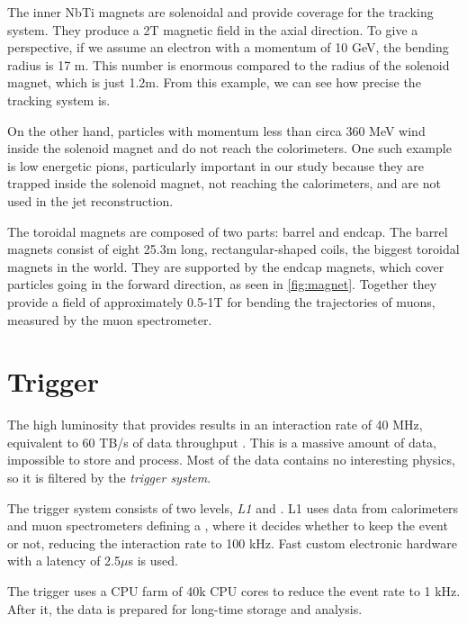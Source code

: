 The inner NbTi magnets are solenoidal and provide coverage for the tracking system.
They produce a 2T magnetic field in the axial direction.
To give a perspective, if we assume an electron with a momentum of 10 GeV, the bending radius is 17 m.
This number is enormous compared to the radius of the solenoid magnet, which is just 1.2m. 
From this example, we can see how precise the tracking system is.

On the other hand, particles with momentum less than circa 360 MeV wind inside the solenoid magnet and do not reach the colorimeters.
One such example is low energetic pions, particularly important in our study because they are trapped inside the solenoid magnet, not reaching the calorimeters, and are not used in the jet reconstruction.

The toroidal magnets are composed of two parts: barrel and endcap.
The barrel magnets consist of eight 25.3m long, rectangular-shaped coils, the biggest toroidal magnets in the world.
They are supported by the endcap magnets, which cover particles going in the forward direction, as seen in \cref{fig:magnet}.
Together they provide a field of approximately 0.5-1T for bending the trajectories of muons, measured by the muon spectrometer. 


\section{Trigger}
\label{sec:trigger}
The high luminosity that \LHC provides results in an interaction rate of 40 MHz, equivalent to 60 TB/s of data throughput \cite{trig}.
This is a massive amount of data, impossible to store and process.
Most of the data contains no interesting physics, so it is filtered by the \emph{trigger system}.

The trigger system consists of two levels, \emph{L1} and \HLT \cite{trig}.
L1 uses data from calorimeters and muon spectrometers defining a \RoI, where it decides whether to keep the event or not, reducing the interaction rate to 100 kHz.  
Fast custom electronic hardware with a latency of 2.5$\mu$s is used.

The \HLT trigger uses a CPU farm of 40k CPU cores to reduce the event rate to 1 kHz.
After it, the data is prepared for long-time storage and analysis.